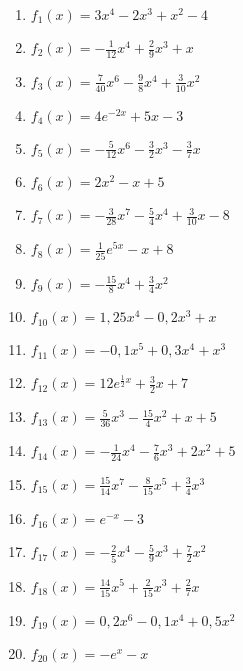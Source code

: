 \begin{Exercise}[title={\raggedright Bestimme jeweils die erste, zweite und dritte Ableitung.}, label=hoehereAbleitungenA1]
	\begin{enumerate}[label=\alph*)]
		\item \(f_1(x)=3x^4-2x^3+x^2-4\)
		\item \(f_2(x)=-\frac{1}{12}x^4+\frac{2}{9}x^3+x\)
		\item \(f_3(x)=\frac{7}{40}x^6-\frac{9}{8}x^4+\frac{3}{10}x^2\)
		\item \(f_4(x)=4e^{-2x}+5x-3\)
		\item \(f_5(x)=-\frac{5}{12}x^6-\frac{3}{2}x^3-\frac{3}{7}x\)
		\item \(f_6(x)=2x^2-x+5\)
		\item \(f_7(x)=-\frac{3}{28}x^7-\frac{5}{4}x^4+\frac{3}{10}x-8\)
		\item \(f_8(x)=\frac{1}{25}e^{5x}-x+8\)
		\item \(f_9(x)=-\frac{15}{8}x^4+\frac{3}{4}x^2\)
		\item \(f_{10}(x)=1,25x^4-0,2x^3+x\)
		\item \(f_{11}(x)=-0,1x^5+0,3x^4+x^3\)
		\item \(f_{12}(x)=12e^{\frac{1}{2}x}+\frac{3}{2}x+7\)
		\item \(f_{13}(x)=\frac{5}{36}x^3-\frac{15}{4}x^2+x+5\)
		\item \(f_{14}(x)=-\frac{1}{24}x^4-\frac{7}{6}x^3+2x^2+5\)
		\item \(f_{15}(x)=\frac{15}{14}x^7-\frac{8}{15}x^5+\frac{3}{4}x^3\)
		\item \(f_{16}(x)=e^{-x}-3\)
		\item \(f_{17}(x)=-\frac{2}{5}x^4-\frac{5}{9}x^3+\frac{7}{2}x^2\)
		\item \(f_{18}(x)=\frac{14}{15}x^5+\frac{2}{15}x^3+\frac{2}{7}x\)
		\item \(f_{19}(x)=0,2x^6-0,1x^4+0,5x^2\)
		\item \(f_{20}(x)=-e^{x}-x\)
	\end{enumerate}
\end{Exercise}
